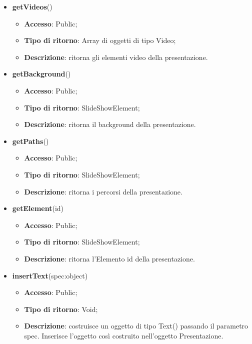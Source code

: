 {\begin{itemize}
\begin{itemize}
				\item \textbf{Descrizione}: ritorna gli elementi audio della presentazione.
			\end{itemize}
			\item \textbf{getVideos}()
			\begin{itemize}
				\item \textbf{Accesso}: Public;
				\item \textbf{Tipo di ritorno}: Array di oggetti di tipo Video;
				\item \textbf{Descrizione}: ritorna gli elementi video della presentazione.
			\end{itemize}
			\item \textbf{getBackground}()
			\begin{itemize}
				\item \textbf{Accesso}: Public;
				\item \textbf{Tipo di ritorno}: SlideShowElement;
				\item \textbf{Descrizione}: ritorna il background della presentazione.
			\end{itemize}
			\item \textbf{getPaths}()
			\begin{itemize}
				\item \textbf{Accesso}: Public;
				\item \textbf{Tipo di ritorno}: SlideShowElement;
				\item \textbf{Descrizione}: ritorna i percorsi della presentazione.
			\end{itemize}
			\item \textbf{getElement}(id)
			\begin{itemize}
				\item \textbf{Accesso}: Public;
				\item \textbf{Tipo di ritorno}: SlideShowElement;
				\item \textbf{Descrizione}: ritorna l'Elemento id della presentazione.
			\end{itemize}
			\item \textbf{insertText}(spec:object)
			\begin{itemize}
				\item \textbf{Accesso}: Public;
				\item \textbf{Tipo di ritorno}: Void;
				\item \textbf{Descrizione}: costruisce un oggetto di tipo Text() passando il parametro spec. Inserisce l’oggetto così costruito nell’oggetto Presentazione.

\end{itemize}
\end{itemize}}
